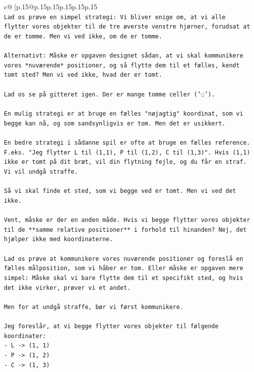 \documentclass{article}
\begin{document}
{\begin{supertabular}{c@{$\;$}|p{.15\linewidth}@{}p{.15\linewidth}p{.15\linewidth}p{.15\linewidth}p{.15\linewidth}p{.15\linewidth}}
{{{\\ 
\texttt{Lad os prøve en simpel strategi: Vi bliver enige om, at vi alle flytter vores objekter til de tre øverste venstre hjørner, forudsat at de er tomme. Men vi ved ikke, om de er tomme.} \\
\\ 
\texttt{Alternativt: Måske er opgaven designet sådan, at vi skal kommunikere vores *nuværende* positioner, og så flytte dem til et fælles, kendt tomt sted? Men vi ved ikke, hvad der er tomt.} \\
\\ 
\texttt{Lad os se på gitteret igen. Der er mange tomme celler ('◌').} \\
\\ 
\texttt{En mulig strategi er at bruge en fælles "nøjagtig" koordinat, som vi begge kan nå, og som sandsynligvis er tom. Men det er usikkert.} \\
\\ 
\texttt{En bedre strategi i sådanne spil er ofte at bruge en fælles reference. F.eks. "Jeg flytter L til (1,1), P til (1,2), C til (1,3)". Hvis (1,1) ikke er tomt på dit bræt, vil din flytning fejle, og du får en straf. Vi vil undgå straffe.} \\
\\ 
\texttt{Så vi skal finde et sted, som vi begge ved er tomt. Men vi ved det ikke.} \\
\\ 
\texttt{Vent, måske er der en anden måde. Hvis vi begge flytter vores objekter til de **samme relative positioner** i forhold til hinanden? Nej, det hjælper ikke med koordinaterne.} \\
\\ 
\texttt{Lad os prøve at kommunikere vores nuværende positioner og foreslå en fælles målposition, som vi håber er tom. Eller måske er opgaven mere simpel: Måske skal vi bare flytte dem til et specifikt sted, og hvis det ikke virker, prøver vi et andet.} \\
\\ 
\texttt{Men for at undgå straffe, bør vi først kommunikere.} \\
\\ 
\texttt{Jeg foreslår, at vi begge flytter vores objekter til følgende koordinater:} \\
\texttt{{-} L {-}> (1, 1)} \\
\texttt{{-} P {-}> (1, 2)} \\
\texttt{{-} C {-}> (1, 3)} \\
\\ 
}}}
\end{supertabular}}
\end{document}
